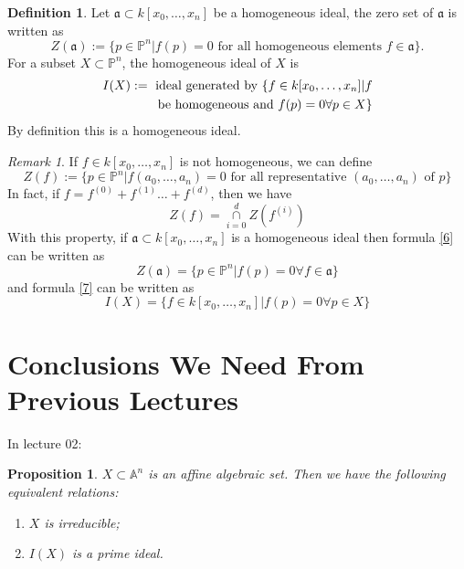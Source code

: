 \documentclass{amsart}
\theoremstyle{plain}
\newtheorem{proposition}{Proposition}
\theoremstyle{definition}
\newtheorem{definition}{Definition}
\theoremstyle{remark}
\newtheorem*{remark}{Remark}
\numberwithin{equation}{section}
\begin{document}
  \begin{definition}
  	Let $ \mathfrak{a}\subset k[x_0,\dots,x_n] $ be a homogeneous ideal, the zero set of $ \mathfrak{a} $ is written as
  	\begin{equation}
  	Z(\mathfrak{a}):=\{ p\in \mathbb{P}^n|f(p)=0 \text{ for all homogeneous elements } f\in \mathfrak{a} \}.\label{6}
  	\end{equation}
  	For a subset $ X\subset \mathbb{P}^n $, the homogeneous ideal of $ X $ is
  	\begin{align}
  	I(X):= \text{ ideal generated by } \{ f\in k[x_0,\dots,x_n]|f \label{7}\\
  	\text{ be homogeneous and } f(p)=0 \forall p\in X \}\notag
  	\end{align}
  	By definition this is a homogeneous ideal.
  \end{definition}
  \begin{remark}
  	If $ f\in k[x_0,\dots,x_n] $ is not homogeneous, we can define
  	\begin{equation}
  	Z(f):=\{ p\in\mathbb{P}^n| f(a_0,\dots,a_n)=0\text{ for all representative } (a_0,\dots,a_n) \text{ of } p \}
  	\end{equation}
  	In fact, if $ f=f^{(0)}+f^{(1)}\dots +f^{(d)} $, then we have
  	\begin{equation}
  	Z(f)=\mathop{\cap}\limits_{i=0}^{d}Z(f^{(i)})
  	\end{equation}
  	With this property, if $ \mathfrak{a} \subset k[x_0,\dots,x_n]$ is a homogeneous ideal then formula \ref{6} can be written as
  	\begin{equation}
  	Z(\mathfrak{a})=\{ p\in \mathbb{P}^n| f(p)=0 \forall f\in \mathfrak{a} \}
  	\end{equation}
  	and formula \ref{7} can be written as
  	\begin{equation}
  	I(X)=\{ f\in k[x_0,\dots,x_n]|f(p)=0 \forall p\in X \}
  	\end{equation}
  \end{remark}

 \section{Conclusions We Need From Previous Lectures}
 In lecture 02:
  \begin{proposition}\label{5}
  	$ X\subset \mathbb{A}^n $ is an affine algebraic set. Then we have the following equivalent relations:
  	\begin{enumerate}
  		\item $ X $ is irreducible;
  		\item $ I(X) $ is a prime ideal.
  	\end{enumerate}
  \end{proposition}
\end{document}
